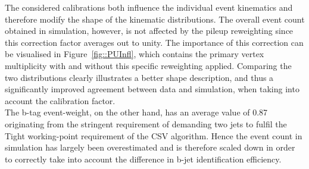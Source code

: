 The considered calibrations both influence the individual event kinematics and therefore modify the shape of the kinematic distributions.
The overall event count obtained in simulation, however, is not affected by the pileup reweighting since this correction factor averages out to unity.
The importance of this correction can be visualised in Figure~\ref{fig::PUInfl}, which contains the primary vertex multiplicity with and without this specific reweighting applied.
Comparing the two distributions clearly illustrates a better shape description, and thus a significantly improved agreement between data and simulation, when taking into account the calibration factor.
\\
The b-tag event-weight, on the other hand, has an average value of 0.87 originating from the stringent requirement of demanding two jets to fulfil the Tight working-point requirement of the CSV algorithm.
Hence the event count in simulation has largely been overestimated and is therefore scaled down in order to correctly take into account the difference in b-jet identification efficiency.
%
%

